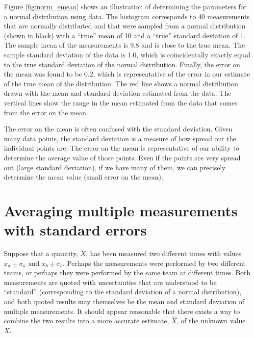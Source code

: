 Figure \ref{fig:norm_emean} shows an illustration of determining the parameters for a normal distribution using data. The histogram corresponds to 40 measurements that are normally distributed and that were sampled from a normal distribution (shown in black) with a ``true'' mean of 10 and a ``true'' standard deviation of 1. The sample mean of the measurements is 9.8 and is close to the true mean. The sample standard deviation of the data is 1.0, which is coincidentally exactly equal to the true standard deviation of the normal distribution. Finally, the error on the mean was found to be 0.2, which is representative of the error in our estimate of the true mean of the distribution. The red line shows a normal distribution drawn with the mean and standard deviation estimated from the data. The vertical lines show the range in the mean estimated from the data that comes from the error on the mean.

The error on the mean is often confused with the standard deviation. Given many data points, the standard deviation is a measure of how spread out the individual points are. The error on the mean is representative of our ability to determine the average value of those points. Even if the points are very spread out (large standard deviation), if we have many of them, we can precisely determine the mean value (small error on the mean).
 
\clearpage

\section{Averaging multiple measurements with standard errors}

Suppose that a quantity, $X$, has been measured two different times with values $x_a\pm\sigma_a$ and $x_b\pm \sigma_b$. Perhaps the measurements were performed by two different teams, or perhaps they were performed by the same team at different times. Both measurements are quoted with uncertainties that are understood to be ``standard'' (corresponding to the standard deviation of a normal distribution), and both quoted results may themselves be the mean and standard deviation of multiple measurements. It should appear reasonable that there exists a way to combine the two results into a more accurate estimate, $\hat X$, of the unknown value $X$. 

